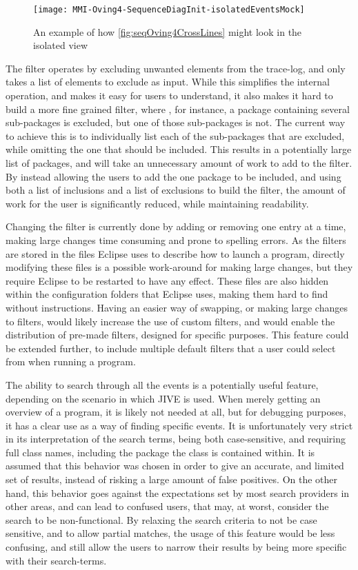 \begin{figure}[H]
	\centering
	\texttt{[image: MMI-Oving4-SequenceDiagInit-isolatedEventsMock]}
	\caption{An example of how \autoref{fig:seqOving4CrossLines} might look in the isolated view}
	\label{fig:seqOving4IsolatedMock}
\end{figure}


The filter operates by excluding unwanted elements from the trace-log, and only takes a list of elements to exclude as input.
While this simplifies the internal operation, and makes it easy for users to understand, it also makes it hard to build a more fine grained filter, where , for instance, a package containing several sub-packages is excluded, but one of those sub-packages is not.
The current way to achieve this is to individually list each of the sub-packages that are excluded, while omitting the one that should be included.
This results in a potentially large list of packages, and will take an unnecessary amount of work to add to the filter.
By instead allowing the users to add the one package to be included, and using both a list of inclusions and a list of exclusions to build the filter, the amount of work for the user is significantly reduced, while maintaining readability.


Changing the filter is currently done by adding or removing one entry at a time, making large changes time consuming and prone to spelling errors.
As the filters are stored in the files Eclipse uses to describe how to launch a program, directly modifying these files is a possible work-around for making large changes, but they require Eclipse to be restarted to have any effect.
These files are also hidden within the configuration folders that Eclipse uses, making them hard to find without instructions.
Having an easier way of swapping, or making large changes to filters, would likely increase the use of custom filters, and would enable the distribution of pre-made filters, designed for specific purposes.
This feature could be extended further, to include multiple default filters that a user could select from when running a program.


The ability to search through all the events is a potentially useful feature, depending on the scenario in which JIVE is used.
When merely getting an overview of a program, it is likely not needed at all, but for debugging purposes, it has a clear use as a way of finding specific events.
It is unfortunately very strict in its interpretation of the search terms, being both case-sensitive, and requiring full class names, including the package the class is contained within.
It is assumed that this behavior was chosen in order to give an accurate, and limited set of results, instead of risking a large amount of false positives.
On the other hand, this behavior goes against the expectations set by most search providers in other areas, and can lead to confused users, that may, at worst, consider the search to be non-functional.
By relaxing the search criteria to not be case sensitive, and to allow partial matches, the usage of this feature would be less confusing, and still allow the users to narrow their results by being more specific with their search-terms.


